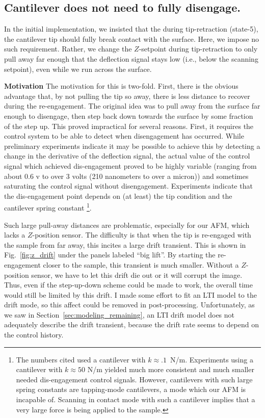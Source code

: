 \subsection{Cantilever does not need to fully disengage.}
In the initial implementation, we insisted that the during tip-retraction (state-5), the cantilever tip should fully break contact with the surface. Here, we impose no such requirement. Rather, we change the $Z$-setpoint during tip-retraction to only pull away far enough that the deflection signal stays low (i.e., below the scanning setpoint), even while we run across the surface.

\textbf{Motivation} The motivation for this is two-fold. First, there is the obvious advantage that, by not pulling the tip so away, there is less distance to recover during the re-engagement. The original idea was to pull away from the surface far enough to disengage, then step back down towards the surface by some fraction of the step up. This proved impractical for several reasons. First, it requires the control system to be able to detect when disengagement has occurred. While preliminary experiments indicate it may be possible to achieve this by detecting a change in the derivative of the deflection signal, the actual value of the control signal which achieved dis-engagement proved to be highly variable (ranging from about 0.6 v to over 3 volts (210 nanometers to over a micron)) and sometimes saturating the control signal without disengagement. Experiments indicate that the dis-engagement point depends on (at least) the tip condition and the cantilever spring constant \footnote{The numbers cited used a cantilever with $k\approx .1$~N/m. Experiments using a cantilever with $k\approx 50$ N/m yielded much more consistent and much smaller needed dis-engagement control signals. However, cantilevers with such large spring constants are tapping-mode cantilevers, a mode which our AFM is incapable of. Scanning in contact mode with such a cantilever implies that a very large force is being applied to the sample.}.

Such large pull-away distances are problematic, especially for our AFM, which lacks a $Z$-position sensor. The difficulty is that when the tip is re-engaged with the sample from far away, this incites a large drift transient.
This is shown in Fig.~\ref{fig:z_drift} under the panels labeled ``big lift''.
By starting the re-engagement closer to the sample, this transient is much smaller. Without a $Z$-position sensor, we have to let this drift die out or it will corrupt the image. Thus, even if the step-up-down scheme could be made to work, the overall time would still be limited by this drift. I made some effort to fit an LTI model to the drift mode, so this affect could be removed in post-processing. Unfortunately, as we saw in Section~\ref{sec:modeling_remaining}, an LTI drift model does not adequately describe the drift transient, because the drift rate seems to depend on the control history.

